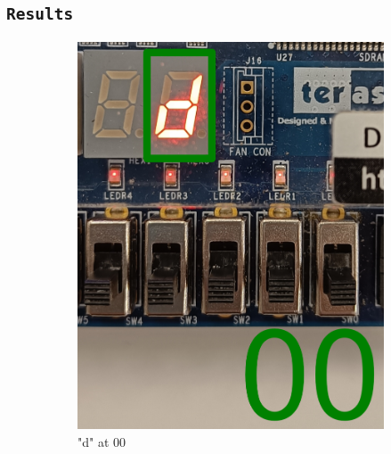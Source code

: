 \documentclass{article}
\let\oldsubsection\subsection
\renewcommand{\subsection}[1]{%
  \oldsubsection{\texttt{#1}}%
  \setcounter{subsubsection}{-1}%
}
\begin{document}
\subsection{Results}
\begin{figure}[h]
    \centering
    \begin{subfigure}{0.4\textwidth}
        \centering
        \includegraphics[width=1\textwidth]{Figures/Part4-00.png}
        \caption{"d" at 00}
        \label{fig:T04pic1}
    \end{subfigure}
    \hfill
    \begin{subfigure}{0.4\textwidth}
        \centering

\end{subfigure}
\end{figure}
\end{document}
